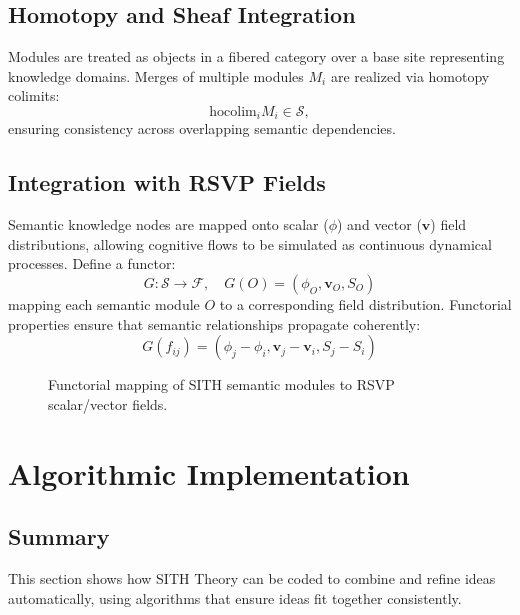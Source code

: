 \documentclass[11pt,oneside]{memoir}
\theoremstyle{plain}
\newcommand{\F}{\mathcal{F}}
\newcommand{\Sfun}{\mathcal{S}}
\begin{document}
\subsection{Homotopy and Sheaf Integration}
Modules are treated as objects in a fibered category over a base site representing knowledge domains. Merges of multiple modules \(M_i\) are realized via homotopy colimits:
\begin{equation}
    \text{hocolim}_i M_i \in \Sfun,
\end{equation}
ensuring consistency across overlapping semantic dependencies.

\subsection{Integration with RSVP Fields}
Semantic knowledge nodes are mapped onto scalar (\(\phi\)) and vector (\(\mathbf{v}\)) field distributions, allowing cognitive flows to be simulated as continuous dynamical processes. Define a functor:
\begin{equation}
    G: \Sfun \to \F, \quad G(O) = (\phi_O, \mathbf{v}_O, S_O)
\end{equation}
mapping each semantic module \(O\) to a corresponding field distribution. Functorial properties ensure that semantic relationships propagate coherently:
\begin{equation}
    G(f_{ij}) = (\phi_j - \phi_i, \mathbf{v}_j - \mathbf{v}_i, S_j - S_i)
\end{equation}

\begin{figure}[h]
\centering
{}
\caption{Functorial mapping of SITH semantic modules to RSVP scalar/vector fields.}
\label{fig:sith_rsvp_overlay}
\end{figure}

\section{Algorithmic Implementation}
\subsection{Summary}
This section shows how SITH Theory can be coded to combine and refine ideas automatically, using algorithms that ensure ideas fit together consistently.
\end{document}
